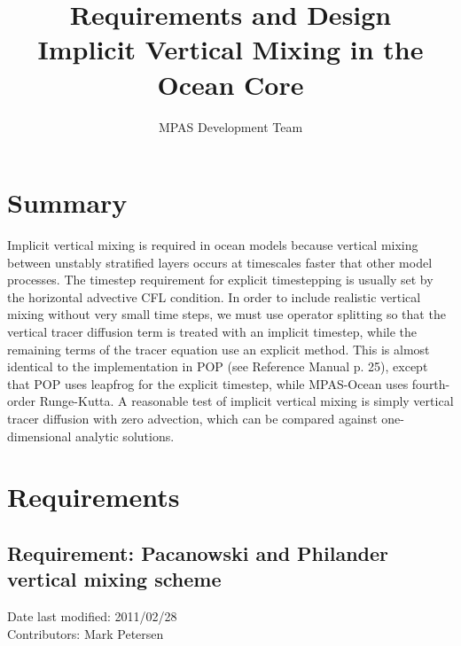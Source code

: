 \documentclass[11pt]{report}
\begin{document}
\title{
Requirements and Design\\
Implicit Vertical Mixing in the Ocean Core}
\author{MPAS Development Team}

\maketitle
\tableofcontents


\chapter{Summary}

Implicit vertical mixing is required in ocean models because vertical mixing between unstably stratified layers occurs at timescales faster that other model processes.  The timestep requirement for explicit timestepping is usually set by the horizontal advective CFL condition.  In order to include realistic vertical mixing without very small time steps, we must use operator splitting so that the vertical tracer diffusion term is treated with an implicit timestep, while the remaining terms of the tracer equation use an explicit method.  This is almost identical to the implementation in POP (see Reference Manual p. 25), except that POP uses leapfrog for the explicit timestep, while MPAS-Ocean uses fourth-order Runge-Kutta.  A reasonable test of implicit vertical mixing is simply vertical tracer diffusion with zero advection, which can be compared against one-dimensional analytic solutions.






\chapter{Requirements}

\section{Requirement: Pacanowski and Philander vertical mixing scheme}
Date last modified: 2011/02/28 \\
Contributors: Mark Petersen \\
\end{document}

